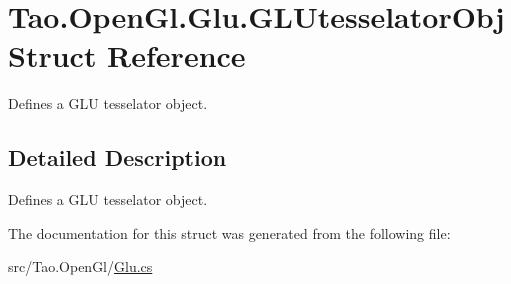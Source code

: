 \hypertarget{struct_tao_1_1_open_gl_1_1_glu_1_1_g_l_utesselator_obj}{
\section{Tao.OpenGl.Glu.GLUtesselatorObj Struct Reference}
\label{struct_tao_1_1_open_gl_1_1_glu_1_1_g_l_utesselator_obj}
}


Defines a GLU tesselator object.  




\subsection{Detailed Description}
Defines a GLU tesselator object. 

The documentation for this struct was generated from the following file:\begin{DoxyCompactItemize}
\item 
src/Tao.OpenGl/\hyperlink{_glu_8cs}{Glu.cs}\end{DoxyCompactItemize}
